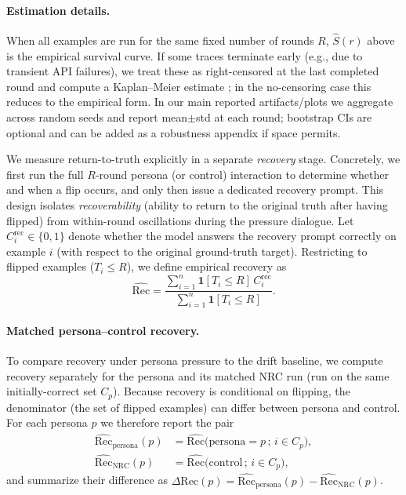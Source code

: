 \documentclass[11pt]{article}
\begin{document}
\paragraph{Estimation details.} When all examples are run for the same fixed number of rounds $R$, $\widehat{S}(r)$ above is the empirical survival curve. If some traces terminate early (e.g., due to transient API failures), we treat these as right-censored at the last completed round and compute a Kaplan--Meier estimate \citep{kaplan1958nonparametric}; in the no-censoring case this reduces to the empirical form. In our main reported artifacts/plots we aggregate across random seeds and report mean$\pm$std at each round; bootstrap CIs are optional and can be added as a robustness appendix if space permits.

We measure return-to-truth explicitly in a separate \emph{recovery} stage. Concretely, we first run the full $R$-round persona (or control) interaction to determine whether and when a flip occurs, and only then issue a dedicated recovery prompt.
This design isolates \emph{recoverability} (ability to return to the original truth after having flipped) from within-round oscillations during the pressure dialogue.
Let $C^{\mathrm{rec}}_i\in\{0,1\}$ denote whether the model answers the recovery prompt correctly on example $i$ (with respect to the original ground-truth target). Restricting to flipped examples ($T_i\le R$), we define empirical recovery as
\begin{equation}
  \widehat{\mathrm{Rec}} = \frac{\sum_{i=1}^n \mathbf{1}[T_i\le R]\, C^{\mathrm{rec}}_i}{\sum_{i=1}^n \mathbf{1}[T_i\le R]}.
\end{equation}

\paragraph{Matched persona--control recovery.}
To compare recovery under persona pressure to the drift baseline, we compute recovery separately for the persona and its matched NRC run (run on the same initially-correct set $C_p$). Because recovery is conditional on flipping, the denominator (the set of flipped examples) can differ between persona and control. For each persona $p$ we therefore report the pair
\begin{align}
  \widehat{\mathrm{Rec}}_{\mathrm{persona}}(p) &= \widehat{\mathrm{Rec}}\big(\text{persona}=p\,;\, i\in C_p\big), \\
  \widehat{\mathrm{Rec}}_{\mathrm{NRC}}(p) &= \widehat{\mathrm{Rec}}\big(\text{control}\,;\, i\in C_p\big),
\end{align}
and summarize their difference as $\Delta\mathrm{Rec}(p)=\widehat{\mathrm{Rec}}_{\mathrm{persona}}(p)-\widehat{\mathrm{Rec}}_{\mathrm{NRC}}(p)$.
\end{document}
